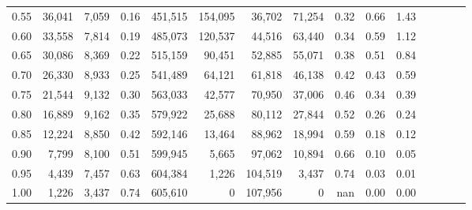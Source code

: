\begin{tabular}{rrrcrrrrrrrrrrr}
0.55 &  36,041 &  7,059 &                                       0.16 &  451,515 &  154,095 &   36,702 &   71,254 &  0.32 &  0.66 &                         1.43 \\
0.60 &  33,558 &  7,814 &                                       0.19 &  485,073 &  120,537 &   44,516 &   63,440 &  0.34 &  0.59 &                         1.12 \\
0.65 &  30,086 &  8,369 &                                       0.22 &  515,159 &   90,451 &   52,885 &   55,071 &  0.38 &  0.51 &                         0.84 \\
0.70 &  26,330 &  8,933 &                                       0.25 &  541,489 &   64,121 &   61,818 &   46,138 &  0.42 &  0.43 &                         0.59 \\
0.75 &  21,544 &  9,132 &                                       0.30 &  563,033 &   42,577 &   70,950 &   37,006 &  0.46 &  0.34 &                         0.39 \\
0.80 &  16,889 &  9,162 &                                       0.35 &  579,922 &   25,688 &   80,112 &   27,844 &  0.52 &  0.26 &                         0.24 \\
0.85 &  12,224 &  8,850 &                                       0.42 &  592,146 &   13,464 &   88,962 &   18,994 &  0.59 &  0.18 &                         0.12 \\
0.90 &   7,799 &  8,100 &                                       0.51 &  599,945 &    5,665 &   97,062 &   10,894 &  0.66 &  0.10 &                         0.05 \\
0.95 &   4,439 &  7,457 &                                       0.63 &  604,384 &    1,226 &  104,519 &    3,437 &  0.74 &  0.03 &                         0.01 \\
1.00 &   1,226 &  3,437 &                                       0.74 &  605,610 &        0 &  107,956 &        0 &   nan &  0.00 &                         0.00 \\
\bottomrule
\end{tabular}
